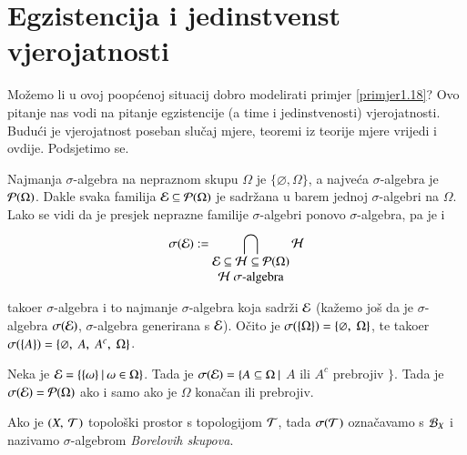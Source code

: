 
\chapter{Egzistencija i jedinstvenst vjerojatnosti}

Mo\v zemo li u ovoj poop\' cenoj situacij dobro modelirati primjer
\ref{primjer1.18}? Ovo pitanje nas vodi na pitanje egzistencije
(a time i jedinstvenosti) vjerojatnosti. Budu\' ci je vjerojatnost
poseban slu\v caj mjere, teoremi iz teorije mjere vrijedi i ovdije.
Podsjetimo se.

Najmanja $\sigma$-algebra na nepraznom skupu $\Omega$ je
$\{\varnothing, \Omega\}$, a najve\' ca $\sigma$-algebra je
$\mathcal{P}({\Omega})$.
Dakle svaka familija $\mathcal{E} \subseteq \mathcal{P}({\Omega})$ je sadr\v zana
u barem jednoj $\sigma$-algebri na $\Omega$.
Lako se vidi da je presjek neprazne familije $\sigma$-algebri ponovo
$\sigma$-algebra, pa je i
\begin{equation} \label{jed:2.1}
    \sigAlg{\E} := \presjek{\shortstack{$\E \subseteq \hh \subseteq
    \partitive{\Omega}$ \\ $\hh$ $\sigma$-algebra}}{} 
        \hh
\end{equation}

tako\dj er $\sigma$-algebra i to najmanje $\sigma$-algebra koja
sadr\v zi $\mathcal{E}$ (ka\v zemo jo\v s da je $\sigma$-algebra
$\sigma({\mathcal{E}})$, $\sigma$-algebra generirana s $\mathcal{E}$).
O\v cito je $\sigma({\{\Omega\}}) = \{ \varnothing, \; \Omega\}$,
te tako\dj er
$\sigma({\{A\}}) = \{ \varnothing, \; A, \; A^c, \; \Omega \}$.

\begin{zad} \label{zad:2.2}
    Neka je $\mathcal{E} = \{{\{ \omega \}} \: | \: {\omega \in \Omega}\}$.
    Tada je $\sigma({\mathcal{E}}) =\{ A \subseteq \Omega \: |$ $A$ ili $A^c$
    prebrojiv $\}$. Tada je $\sigma({\mathcal{E}}) = \mathcal{P}({\Omega})$ ako
    i samo ako je $\Omega$ kona\v can ili prebrojiv.
\end{zad}

%
%

Ako je $(X, \: \mathcal{T})$ topolo\v ski prostor s topologijom $\mathcal{T}$, tada
$\sigma({\mathcal{T}})$ ozna\v cavamo s $\mathcal{B}_{X}$ i nazivamo
$\sigma$-algebrom \emph{Borelovih skupova}.

